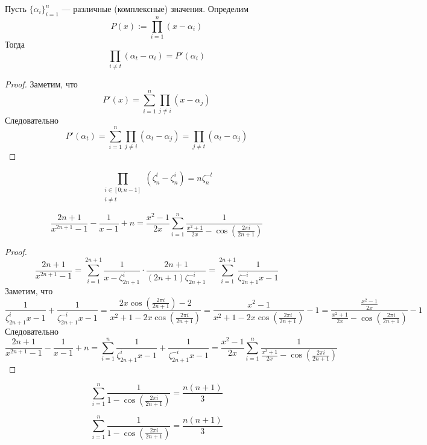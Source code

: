 \documentclass[12pt,a4paper]{article}
\begin{document}
    \begin{lemma}
        Пусть $\{\alpha_i\}_{i=1}^n$ --- различные (комплексные) значения. Определим
        \[P(x) := \prod_{i=1}^n (x - \alpha_i)\]
        Тогда
        \[\prod_{i \neq t} (\alpha_t - \alpha_i) = P'(\alpha_i)\]
    \end{lemma}

    \begin{proof}
        Заметим, что
        \[P'(x) = \sum_{i=1}^n \prod_{j \neq i} (x - \alpha_j)\]
        Следовательно
        \[P'(\alpha_t) = \sum_{i=1}^n \prod_{j \neq i} (\alpha_t - \alpha_j) = \prod_{j \neq t} (\alpha_t - \alpha_j)\]
    \end{proof}

    \begin{corollary}
        \[\prod_{\substack{i \in [0; n-1]\\ i \neq t}} (\zeta_n^t - \zeta_n^i) = n\zeta_n^{-t}\]
    \end{corollary}

    \begin{theorem}
        \[\frac{2n+1}{x^{2n+1}-1} - \frac{1}{x-1} + n = \frac{x^2-1}{2x} \sum_{i=1}^n \frac{1}{\frac{x^2+1}{2x} - \cos(\frac{2\pi i}{2n+1})}\]
    \end{theorem}

    \begin{proof}
        \[
            \frac{2n+1}{x^{2n+1}-1}
            = \sum_{i=1}^{2n+1} \frac{1}{x - \zeta_{2n+1}^i} \cdot \frac{2n+1}{(2n+1) \zeta_{2n+1}^{-i}}
            = \sum_{i=1}^{2n+1} \frac{1}{\zeta_{2n+1}^{-i} x - 1}
        \]
        Заметим, что
        \[
            \frac{1}{\zeta_{2n+1}^i x - 1} + \frac{1}{\zeta_{2n+1}^{-i} x - 1}
            = \frac{2x \cos(\frac{2 \pi i}{2n+1}) - 2}{x^2 + 1 - 2x \cos(\frac{2 \pi i}{2n+1})}
            = \frac{x^2 - 1}{x^2 + 1 - 2x \cos(\frac{2 \pi i}{2n+1})} - 1
            = \frac{\frac{x^2-1}{2x}}{\frac{x^2+1}{2x} - \cos(\frac{2\pi i}{2n+1})} - 1
        \]
        Следовательно
        \[
            \frac{2n+1}{x^{2n+1}-1} - \frac{1}{x-1} + n
            = \sum_{i=1}^n \frac{1}{\zeta_{2n+1}^i x - 1} + \frac{1}{\zeta_{2n+1}^{-i} x - 1}
            = \frac{x^2-1}{2x} \sum_{i=1}^n \frac{1}{\frac{x^2+1}{2x} - \cos(\frac{2\pi i}{2n+1})}
        \]
    \end{proof}

    \begin{corollary}
        \[\sum_{i=1}^n \frac{1}{1 - \cos(\frac{2\pi i}{2n+1})} = \frac{n(n+1)}{3}\]
    \end{corollary}

    \begin{corollary}
        \[\sum_{i=1}^n \frac{1}{1 - \cos(\frac{2\pi i}{2n+1})} = \frac{n(n+1)}{3}\]
    \end{corollary}
\end{document}
